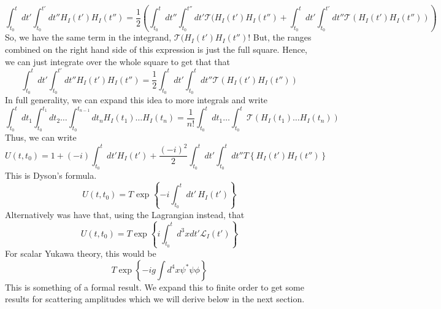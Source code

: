 \[
\int_{ t_0 } ^ t dt' \int_{ t_0 } ^{ t' } dt'' H_{ I } ( t' ) H_{ I } ( t'' ) =\frac{1}{2 } \left(  \int_{ t_ 0 } ^ t dt'' \int_{ t_0 }^{ t''} dt' \mathcal{ T } ( H_{ I }( t' ) H_{ I } ( t'' )  + \int _{ t_0 } ^ t dt' \int_{ t_0  }^{ t' } dt'' \mathcal{ T } ( H_I ( t' ) H _ I ( t'' ) ) \right)  
\] So, we have the same term in the integrand, $ \mathcal{ T } ( H_ I ( t' ) H _ I ( t'') $!
But, the ranges combined on the right hand side of 
this expression is just the full square. 
Hence, we can just integrate over the whole square to get that that
\[
\int_{ t_0 } ^ t dt' \int_{ t_0 } ^{ t' } dt'' H_{ I } ( t' ) H_{ I } ( t'' ) = \frac{1}{2 } \int_{ t_0 } ^ t dt' \int_{ t_0  }^ t dt'' \mathcal{ T } ( H _I ( t' ) H_ I ( t'' ) )  
\]  In full generality, we can expand this 
idea to more integrals and write 
\[
\int_{ t_0  } ^ t dt_1 \int_{ t_ 0 } ^{ t_1 } dt_2 \dots \int_{ t_0 } ^{ t_{ n - 1  } } dt_{ n } H_I ( t_1) \dots  H_{ I } ( t_{ n } )  = \frac{1}{n ! } \int_{ t_0 } ^ t dt_1 \dots \int_{ t_0 } ^{ t  } \mathcal{ T } \left(  H _ I ( t_1 ) \dots H _ I ( t_{ n } )  \right) 
\]  
Thus, we can write 
\[
U ( t, t_0) = 1 + ( -i ) \int_{ t_0 } ^ t dt' H_I ( t' ) + \frac{ ( -i ) ^ 2 }{2 } \int_{ t_0 }^t dt' \int_{ t_0 }^ t dt'' T \left\{  H_I ( t' ) H_I ( t'' )  \right\}  
\] This is Dyson's formula. 
\[
U ( t, t_0) = T \text{ exp } \left\{  - i \int_{ t_0 } ^ t dt' \, H_I ( t' )  \right\} 
\] Alternatively was have that, using the Lagrangian instead, that 
\[
U ( t, t_0 ) = T \exp \left\{  i \int_{ t_0 } ^ t  d^ 3 x dt ' \mathcal{ L }_ I ( t' )  \right\} 
\] For scalar Yukawa theory,  this would be 
\[
T \exp \left\{   - i g \int d^  4 x \psi ^ * \psi \phi  \right\} 
\] This is something of a formal result. 
We expand this to finite order to get some results for scattering
amplitudes which we will derive below in the next section. 

